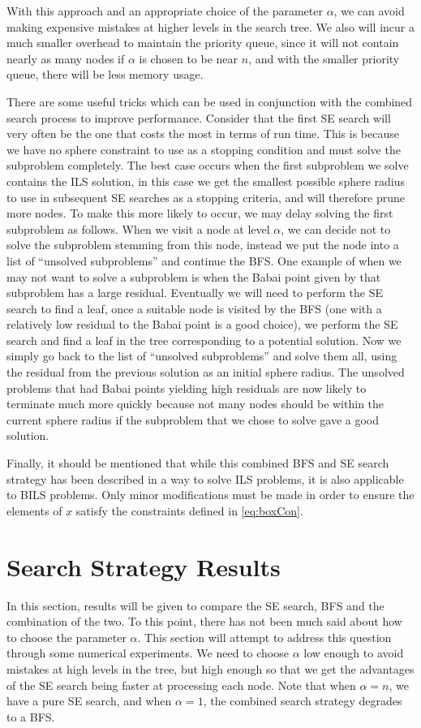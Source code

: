 \documentclass[12pt,Bold,letterpaper]{mcgilletdclass}
\newcommand{\vsp}{\vspace{\baselineskip}}
\begin{document}
With this approach and an appropriate choice of the parameter $\alpha$, we can avoid making expensive mistakes at higher levels in the search tree. We also will incur a much smaller overhead to maintain the priority queue, since it will not contain nearly as many nodes if $\alpha$ is chosen to be near $n$, and with the smaller priority queue, there will be less memory usage. 

There are some useful tricks which can be used in conjunction with the combined search process to improve performance. Consider that the first SE search will very often be the one that costs the most in terms of run time. This is because we have no sphere constraint to use as a stopping condition and must solve the subproblem completely. The best case occurs when the first subproblem we solve contains the ILS solution, in this case we get the smallest possible sphere radius to use in subsequent SE searches as a stopping criteria, and will therefore prune more nodes. To make this more likely to occur, we may delay solving the first subproblem as follows. When we visit a node at level $\alpha$, we can decide not to solve the subproblem stemming from this node, instead we put the node into a list of ``unsolved subproblems'' and continue the BFS. One example of when we may not want to solve a subproblem is when the Babai point given by that subproblem has a large residual. Eventually we will need to perform the SE search to find a leaf, once a suitable node is visited by the BFS (one with a relatively low residual to the Babai point is a good choice), we perform the SE search and find a leaf in the tree corresponding to a potential solution. Now we simply go back to the list of ``unsolved subproblems'' and solve them all, using the residual from the previous solution as an initial sphere radius. The unsolved problems that had Babai points yielding high residuals are now likely to terminate much more quickly because not many nodes should be within the current sphere radius if the subproblem that we chose to solve gave a good solution. 

Finally, it should be mentioned that while this combined BFS and SE search strategy has been described in a way to solve ILS problems, it is also applicable to BILS problems. Only minor modifications must be made in order to ensure the elements of $x$ satisfy the constraints defined in \ref{eq:boxCon}.

\vsp \section{Search Strategy Results} \label{sub:SearchResults}
In this section, results will be given to compare the SE search, BFS and the combination of the two. To this point, there has not been much said about how to choose the parameter $\alpha$. This section will attempt to address this question through some numerical experiments. We need to choose $\alpha$ low enough to avoid mistakes at high levels in the tree, but high enough so that we get the advantages of the SE search being faster at processing each node. Note that when $\alpha = n$, we have a pure SE search, and when $\alpha = 1$, the combined search strategy degrades to a BFS. 
\end{document}
